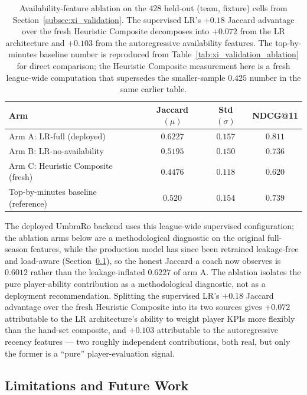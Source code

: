 \begin{table}[!htbp]
\centering
\caption{Availability-feature ablation on the $428$ held-out (team, fixture) cells from Section~\ref{subsec:xi_validation}. The supervised LR's $+0.18$ Jaccard advantage over the fresh Heuristic Composite decomposes into $+0.072$ from the LR architecture and $+0.103$ from the autoregressive availability features. The top-by-minutes baseline number is reproduced from Table~\ref{tab:xi_validation_ablation} for direct comparison; the Heuristic Composite measurement here is a fresh league-wide computation that supersedes the smaller-sample $0.425$ number in the same earlier table.}
\label{tab:availability_ablation}
\begin{tabular}{|l|c|c|c|}
\hline
\textbf{Arm} & \textbf{Jaccard $(\mu)$} & \textbf{Std $(\sigma)$} & \textbf{NDCG@11} \\
\hline
Arm A: LR-full (deployed) & $\mathbf{0.6227}$ & $0.157$ & $\mathbf{0.811}$ \\
\hline
Arm B: LR-no-availability & $0.5195$ & $0.150$ & $0.736$ \\
\hline
Arm C: Heuristic Composite (fresh) & $0.4476$ & $0.118$ & $0.620$ \\
\hline
Top-by-minutes baseline (reference) & $0.520$ & $0.154$ & $0.739$ \\
\hline
\end{tabular}
\end{table}

The deployed UmbraRo backend uses this league-wide supervised configuration; the ablation arms below are a methodological diagnostic on the original full-season features, while the production model has since been retrained leakage-free and load-aware (Section~\ref{subsec:xi_limitations}), so the honest Jaccard a coach now observes is $0.6012$ rather than the leakage-inflated $0.6227$ of arm A. The ablation isolates the pure player-ability contribution as a methodological diagnostic, not as a deployment recommendation. Splitting the supervised LR's $+0.18$ Jaccard advantage over the fresh Heuristic Composite into its two sources gives $+0.072$ attributable to the LR architecture's ability to weight player KPIs more flexibly than the hand-set composite, and $+0.103$ attributable to the autoregressive recency features --- two roughly independent contributions, both real, but only the former is a ``pure'' player-evaluation signal.

\subsection{Limitations and Future Work}
\label{subsec:xi_limitations}

